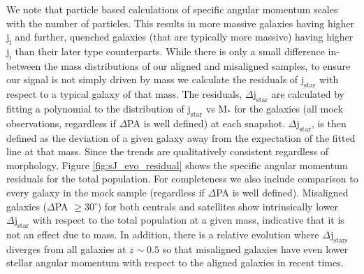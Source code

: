 We note that particle based calculations of specific angular momentum scales with the number of particles. This results in more massive galaxies having higher $\mathrm{j_{i}}$ and further, quenched galaxies (that are typically more massive) having higher $\mathrm{j_{i}}$ than their later type counterparts. While there is only a small difference in-between the mass distributions of our aligned and misaligned samples, to ensure our signal is not simply driven by mass we calculate the residuals of $\mathrm{j_{star}}$ with respect to a typical galaxy of that mass. The residuals, $\Delta \mathrm{j_{star}}$ are calculated by fitting a polynomial to the distribution of $\mathrm{j_{star}}$ vs $\mathrm{M_{\ast}}$ for the galaxies (all mock observations, regardless if $\Delta$PA is well defined) at each snapshot. $\Delta \mathrm{j_{star}}$, is then defined as the deviation of a given galaxy away from the expectation of the fitted line at that mass. Since the trends are qualitatively consistent regardless of morphology, Figure \ref{fig:sJ_evo_residual} shows the specific angular momentum residuals for the total population. For completeness we also include comparison to every galaxy in the mock sample (regardless if $\Delta$PA is well defined). Misaligned galaxies ($\Delta$PA $\geq 30^{\circ}$) for both centrals and satellites show intrinsically lower $\Delta \mathrm{j_{star}}$ with respect to the total population at a given mass, indicative that it is not an effect due to mass. In addition, there is a relative evolution where $\Delta \mathrm{j_{stars}}$ diverges from all galaxies at $z \sim 0.5$ so that misaligned galaxies have even lower stellar angular momentum with respect to the aligned galaxies in recent times.

